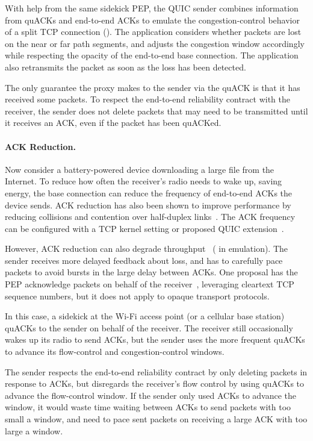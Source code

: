 With help from the same sidekick PEP, the QUIC sender combines information from
quACKs and end-to-end ACKs to emulate the congestion-control behavior of a
split TCP connection (). The application considers
whether packets are lost on the near or far path segments, and adjusts the
congestion window accordingly while respecting the opacity of the end-to-end
base connection. The application also retransmits the packet as soon as the
loss has been detected.

The only guarantee the proxy makes to the sender via the quACK is that it has
received some packets. To respect the end-to-end reliability contract with the
receiver, the sender does not delete packets that may need to be transmitted
until it receives an ACK, even if the packet has been quACKed.

\paragraph{ACK Reduction.}

Now consider a battery-powered device downloading a large file from the
Internet. To reduce how often the receiver's
radio needs to wake up, saving energy, the base connection can reduce the
frequency of end-to-end ACKs the device sends.
ACK reduction has also been shown to improve performance by reducing collisions
and contention over half-duplex links~\cite{custura2023reducing,li2020tack}.
The ACK frequency can be configured with a TCP kernel setting or proposed
QUIC extension~\cite{ietf-quic-ack-frequency-07}.

However, ACK reduction can also degrade throughput~\cite{custura2023reducing,custura2020impact}
( in emulation).
The sender receives more delayed feedback about loss, and has to carefully
pace packets to avoid bursts in the large delay between ACKs.
One proposal has the PEP acknowledge packets on behalf of the
receiver~\cite{kliazovich2012arqproxy}, leveraging cleartext TCP sequence
numbers, but it does not apply to opaque transport protocols.

In this case, a sidekick at the Wi-Fi access point (or a cellular base station)
quACKs to the sender on behalf of the receiver. The receiver still occasionally
wakes up its radio to send ACKs, but the sender uses the more frequent quACKs
to advance its flow-control and congestion-control windows.

The sender respects the end-to-end reliability contract by only deleting packets
in response to ACKs, but disregards the receiver's flow control by using quACKs
to advance the flow-control window. If the sender only used ACKs to advance the
window, it would waste time waiting between ACKs to send packets with too small
a window, and need to pace sent packets on receiving a large ACK with too large
a window.

